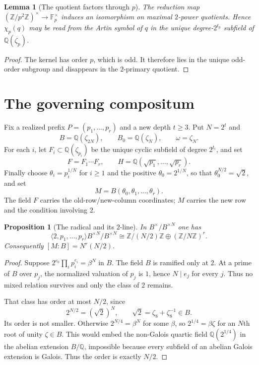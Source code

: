 \documentclass[11pt]{article}
\newtheorem{proposition}[theorem]{Proposition}
\newtheorem{lemma}[theorem]{Lemma}
\theoremstyle{definition}
\theoremstyle{remark}
\newcommand{\Z}{\mathbb Z}
\newcommand{\Q}{\mathbb Q}
\newcommand{\F}{\mathbb F}
\begin{document}
\begin{lemma}[The quotient factors through $p$]\label{lem:factor}
The reduction map $(\Z/p^2\Z)^\times\to\F_p^\times$ induces an isomorphism
on maximal $2$-power quotients.  Hence $\chi_p(q)$ may be read from the
Artin symbol of $q$ in the unique degree-$2^{t_p}$ subfield of
$\Q(\zeta_p)$.
\end{lemma}

\begin{proof}
The kernel has order $p$, which is odd.  It therefore lies in the unique
odd-order subgroup and disappears in the $2$-primary quotient.
\end{proof}

\section{The governing compositum}

Fix a realized prefix $P=(p_1,\ldots,p_r)$ and a new depth $t\ge3$.  Put
$N=2^t$ and
\[
  B=\Q(\zeta_{2N}),\qquad B_0=\Q(\zeta_N),\qquad
  \omega=\zeta_N.
\]
For each $i$, let $F_i\subset\Q(\zeta_{p_i})$ be the unique cyclic
subfield of degree $2^{t_i}$, and set
\[
  F=F_1\cdots F_r,\qquad
  H=\Q(\sqrt{p_1},\ldots,\sqrt{p_r}).
\]
Finally choose $\theta_i=p_i^{1/N}$ for $i\ge1$ and the positive
$\theta_0=2^{1/N}$, so that $\theta_0^{N/2}=\sqrt2$, and set
\[
  M=B(\theta_0,\theta_1,\ldots,\theta_r).
\]
The field $F$ carries the old-row/new-column coordinates; $M$ carries the
new row and the condition involving $2$.

\begin{proposition}[The radical and its $2$-line]\label{prop:radical}
In $B^\times/B^{\times N}$ one has
\[
 \langle2,p_1,\ldots,p_r\rangle B^{\times N}/B^{\times N}
 \cong \Z/(N/2)\Z\oplus(\Z/N\Z)^r.
\]
Consequently $[M:B]=N^r(N/2)$.
\end{proposition}

\begin{proof}
Suppose $2^{e_0}\prod_i p_i^{e_i}=\beta^N$ in $B$.  The field $B$ is
ramified only at $2$.  At a prime of $B$ over $p_j$, the normalized
valuation of $p_j$ is $1$, hence $N\mid e_j$ for every $j$.  Thus no mixed
relation survives and only the class of $2$ remains.

That class has order at most $N/2$, since
\[
  2^{N/2}=(\sqrt2)^N,
  \qquad \sqrt2=\zeta_8+\zeta_8^{-1}\in B.
\]
Its order is not smaller.  Otherwise $2^{N/4}=\beta^N$ for some $\beta$,
so $2^{1/4}=\beta\zeta$ for an $N$th root of unity $\zeta\in B$.  This
would embed the non-Galois quartic field $\Q(2^{1/4})$ in the abelian
extension $B/\Q$, impossible because every subfield of an abelian Galois
extension is Galois.  Thus the order is exactly $N/2$.
\end{proof}
\end{document}
